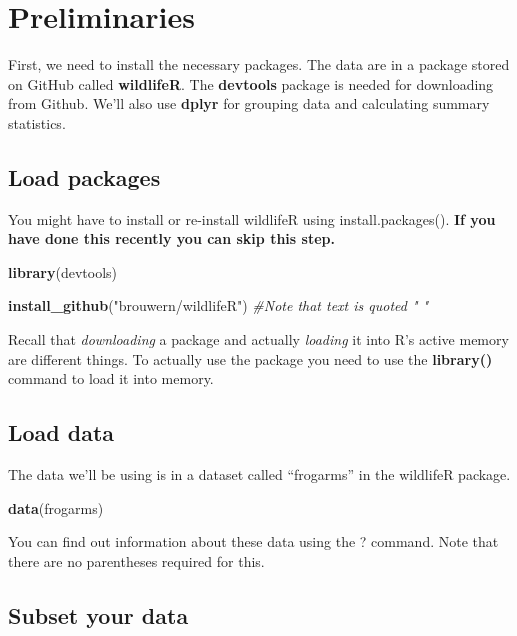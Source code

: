 \documentclass[]{book}
\newenvironment{Shaded}{\begin{snugshade}}{\end{snugshade}}
\newcommand{\KeywordTok}[1]{\textcolor[rgb]{0.13,0.29,0.53}{\textbf{#1}}}
\newcommand{\StringTok}[1]{\textcolor[rgb]{0.31,0.60,0.02}{#1}}
\newcommand{\CommentTok}[1]{\textcolor[rgb]{0.56,0.35,0.01}{\textit{#1}}}
\newcommand{\NormalTok}[1]{#1}
\theoremstyle{definition}
\theoremstyle{definition}
\theoremstyle{definition}
\theoremstyle{remark}
\begin{document}
\section{Preliminaries}\label{preliminaries-1}

First, we need to install the necessary packages. The data are in a
package stored on GitHub called \textbf{wildlifeR}. The
\textbf{devtools} package is needed for downloading from Github. We'll
also use \textbf{dplyr} for grouping data and calculating summary
statistics.

\subsection{Load packages}\label{load-packages}

You might have to install or re-install wildlifeR using
install.packages(). \textbf{If you have done this recently you can skip
this step.}

\begin{Shaded}
\begin{Highlighting}[]
\KeywordTok{library}\NormalTok{(devtools)}

\KeywordTok{install_github}\NormalTok{(}\StringTok{"brouwern/wildlifeR"}\NormalTok{) }\CommentTok{#Note that text is quoted " "}
\end{Highlighting}
\end{Shaded}

Recall that \emph{downloading} a package and actually \emph{loading} it
into R's active memory are different things. To actually use the package
you need to use the \textbf{library()} command to load it into memory.

\subsection{Load data}\label{load-data}

The data we'll be using is in a dataset called ``frogarms'' in the
wildlifeR package.

\begin{Shaded}
\begin{Highlighting}[]
\KeywordTok{data}\NormalTok{(frogarms)}
\end{Highlighting}
\end{Shaded}

You can find out information about these data using the ? command. Note
that there are no parentheses required for this.

\subsection{Subset your data}\label{subset-your-data}
\end{document}

